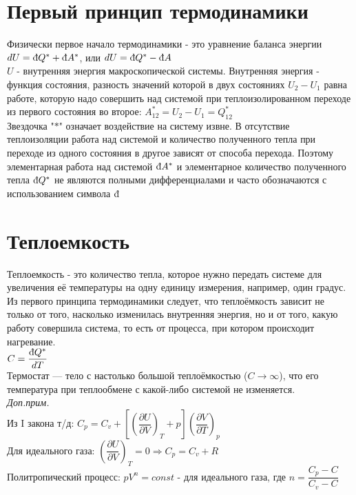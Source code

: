 \begin{multicols*}{2}
		\section{Первый принцип термодинамики}
		Физически первое начало термодинамики - это уравнение баланса энергии\\
		$dU = \mbox{\dj}Q^* + \mbox{\dj}A^*$, или $dU = \mbox{\dj}Q^* - \mbox{\dj}A$\\
		$U$ - внутренняя энергия макроскопической системы. Внутренняя энергия - функция состояния, разность значений которой в двух состояниях $U_2 - U_1$ равна работе, которую надо совершить над системой при теплоизолированном переходе из первого состояния во второе: $A^*_{12} = U_2 - U_1 = Q^*_{12}$\\
		Звездочка "$*$" означает воздействие на систему извне. В отсутствие теплоизоляции работа над системой и количество полученного тепла при переходе из одного состояния в другое зависят от способа перехода. Поэтому элементарная работа над системой $\mbox{\dj}A^*$ и элементарное количество полученного тепла $\mbox{\dj}Q^*$ не являются полными дифференциалами и часто обозначаются с использованием символа $\mbox{\dj}$\\

		\section{Теплоемкость}
		Теплоемкость - это количество тепла, которое нужно передать системе для увеличения её температуры на одну единицу измерения, например, один градус. Из первого принципа термодинамики следует, что теплоёмкость зависит не только от того, насколько изменилась внутренняя энергия, но и от того, какую работу совершила система, то есть от процесса, при котором происходит нагревание.\\
		$C = \dfrac{\mbox{\dj} Q^*}{dT}$\\
		Термостат — тело с настолько большой теплоёмкостью ($C \rightarrow \infty$), что его температура при теплообмене с какой-либо системой не изменяется.\\
		\textit{Доп.прим.}\\
		Из I закона т/д: $C_p = C_v + \left[\left(\dfrac{\partial U}{\partial V}\right)_T + p\right]\left(\dfrac{\partial V}{\partial T}\right)_p$\\
		Для идеального газа: $\left(\dfrac{\partial U}{\partial V}\right)_T = 0 \Rightarrow C_p = C_v + R$\\
		Политропический процесс: $pV^n = const$ - для идеального газа, где $n = \dfrac{C_p - C}{C_v - C}$\\


\end{multicols*}
